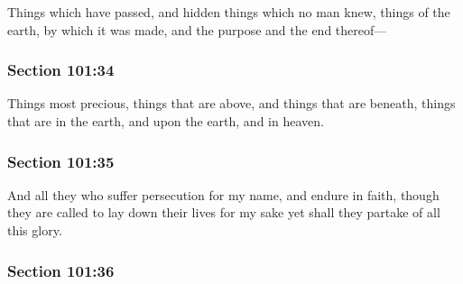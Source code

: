 		Things which have passed, and hidden things which no man knew, things of the earth, by which it was made, and the purpose and the end thereof---


	\subsubsection{Section 101:34} %
		\label{DC101-34}

		Things most precious, things that are above, and things that are beneath, things that are in the earth, and upon the earth, and in heaven.


	\subsubsection{Section 101:35} %
		\label{DC101-35}

		And all they who suffer persecution for my name, and endure in faith, though they are called to lay down their lives for my sake yet shall they partake of all this glory.


	\subsubsection{Section 101:36} %
		\label{DC101-36}

